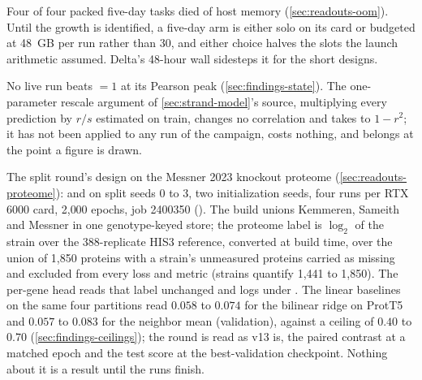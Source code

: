  Four of four packed five-day tasks died of host memory
(\cref{sec:readouts-oom}). Until the growth is identified, a five-day arm is either solo on
its card or budgeted at 48~GB per run rather than 30, and either choice halves the slots
the launch arithmetic assumed. Delta's 48-hour wall sidesteps it for the short designs.

 No live run beats  $= 1$ at its
Pearson peak (\cref{sec:findings-state}). The one-parameter rescale argument of
\cref{sec:strand-model}'s source, multiplying every prediction by $r/s$ estimated on
train, changes no correlation and takes  to $1 - r^2$; it has not been applied
to any run of the campaign, costs nothing, and belongs at the point a figure is drawn.

 The split round's design on
the Messner 2023 knockout proteome (\cref{sec:readouts-proteome}):  and
 on split seeds 0 to 3, two initialization seeds, four runs per RTX 6000
card, 2{,}000 epochs, job 2400350 (). The build
 unions Kemmeren, Sameith and Messner in one genotype-keyed store;
the proteome label is $\log_2$ of the strain over the 388-replicate HIS3 reference,
converted at build time, over the union of 1,850 proteins with a strain's unmeasured
proteins carried as missing and excluded from every loss and metric (strains quantify
1{,}441 to 1{,}850). The per-gene head reads that label unchanged and logs under
. The linear baselines on the same four partitions read $0.058$ to
$0.074$ for the bilinear ridge on ProtT5 and $0.057$ to $0.083$ for the neighbor mean
(validation), against a ceiling of $0.40$ to $0.70$ (\cref{sec:findings-ceilings}); the
round is read as v13 is, the paired contrast at a matched epoch and the test score at the
best-validation checkpoint. Nothing about it is a result until the runs finish.
